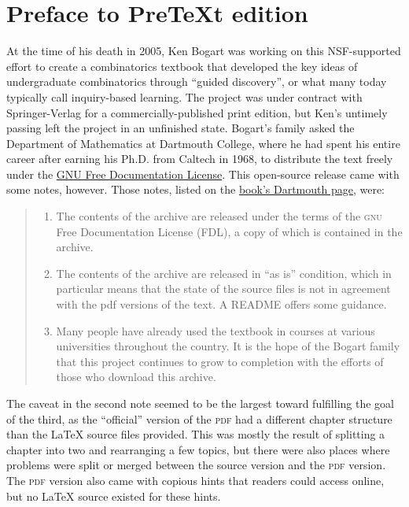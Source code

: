 \documentclass[10pt,]{book}
\newcommand{\initialism}[1]{\textsc{\MakeLowercase{#1}}}
\theoremstyle{plain}
\theoremstyle{definition}
\theoremstyle{definition}
\numberwithin{equation}{chapter}
\begin{document}
\chapter*{Preface to PreTeXt edition}\label{ptx-preface}
\hypertarget{p-20}{}%
At the time of his death in 2005, Ken Bogart was working on this NSF-supported effort to create a combinatorics textbook that developed the key ideas of undergraduate combinatorics through ``guided discovery'', or what many today typically call inquiry-based learning. The project was under contract with Springer-Verlag for a commercially-published print edition, but Ken's untimely passing left the project in an unfinished state. Bogart's family asked the Department of Mathematics at Dartmouth College, where he had spent his entire career after earning his Ph.D. from Caltech in 1968, to distribute the text freely under the \hyperref[appendix-gfdl]{GNU Free Documentation License}. This open-source release came with some notes, however. Those notes, listed on the \href{https://www.math.dartmouth.edu/news-resources/electronic/kpbogart/}{book's Dartmouth page}, were:%
\begin{quote}\hypertarget{blockquote-2}{}
\hypertarget{p-21}{}%
\leavevmode%
\begin{enumerate}
\item\hypertarget{li-1}{}The contents of the archive are released under the terms of the \initialism{GNU} Free Documentation License (FDL), a copy of which is contained in the archive.%
\item\hypertarget{li-2}{}The contents of the archive are released in ``as is'' condition, which in particular means that the state of the source files is not in agreement with the pdf versions of the text. A README offers some guidance.%
\item\hypertarget{li-3}{}Many people have already used the textbook in courses at various universities throughout the country. It is the hope of the Bogart family that this project continues to grow to completion with the efforts of those who download this archive.%
\end{enumerate}
%
\end{quote}
\hypertarget{p-22}{}%
The caveat in the second note seemed to be the largest toward fulfilling the goal of the third, as the ``official'' version of the \initialism{PDF} had a different chapter structure than the \LaTeX{} source files provided. This was mostly the result of splitting a chapter into two and rearranging a few topics, but there were also places where problems were split or merged between the source version and the \initialism{PDF} version. The \initialism{PDF} version also came with copious hints that readers could access online, but no \LaTeX{} source existed for these hints.%
\end{document}
